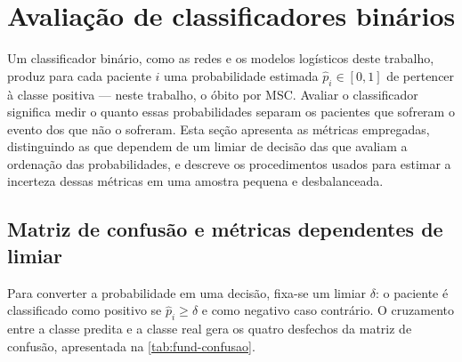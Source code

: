 %
%

\section{Avaliação de classificadores binários}
\label{sec:fund-metricas}

Um classificador binário, como as redes e os modelos logísticos deste
trabalho, produz para cada paciente $i$ uma probabilidade estimada
$\hat{p}_i \in [0, 1]$ de pertencer à classe positiva --- neste trabalho, o
óbito por \gls{MSC}. Avaliar o classificador significa medir o quanto essas
probabilidades separam os pacientes que sofreram o evento dos que não o
sofreram. Esta seção apresenta as métricas empregadas, distinguindo as que
dependem de um limiar de decisão das que avaliam a ordenação das
probabilidades, e descreve os procedimentos usados para estimar a incerteza
dessas métricas em uma amostra pequena e desbalanceada.

\subsection{Matriz de confusão e métricas dependentes de limiar}
\label{subsec:fund-confusao}

Para converter a probabilidade em uma decisão, fixa-se um limiar $\delta$: o
paciente é classificado como positivo se $\hat{p}_i \geq \delta$ e como
negativo caso contrário. O cruzamento entre a classe predita e a classe real
gera os quatro desfechos da matriz de confusão, apresentada na
\autoref{tab:fund-confusao}.

